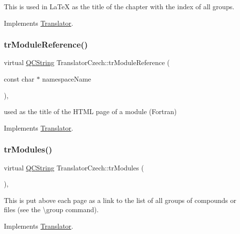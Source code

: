 This is used in La\+TeX as the title of the chapter with the index of all groups. 

Implements \mbox{\hyperlink{class_translator}{Translator}}.

\mbox{\label{class_translator_czech_a82a5db79fb72c7c2fd866e839df54123}} 
\subsubsection{\texorpdfstring{trModuleReference()}{trModuleReference()}}
{\footnotesize\ttfamily virtual \mbox{\hyperlink{class_q_c_string}{Q\+C\+String}} Translator\+Czech\+::tr\+Module\+Reference (\begin{DoxyParamCaption}\item[{const char $\ast$}]{namespace\+Name }\end{DoxyParamCaption})\hspace{0.3cm}{\ttfamily [inline]}, {\ttfamily [virtual]}}

used as the title of the H\+T\+ML page of a module (Fortran) 

Implements \mbox{\hyperlink{class_translator}{Translator}}.

\mbox{\label{class_translator_czech_aafd3c3fd4eea6b65d8b63368235e3eb9}} 
\subsubsection{\texorpdfstring{trModules()}{trModules()}}
{\footnotesize\ttfamily virtual \mbox{\hyperlink{class_q_c_string}{Q\+C\+String}} Translator\+Czech\+::tr\+Modules (\begin{DoxyParamCaption}{ }\end{DoxyParamCaption})\hspace{0.3cm}{\ttfamily [inline]}, {\ttfamily [virtual]}}

This is put above each page as a link to the list of all groups of compounds or files (see the \textbackslash{}group command). 

Implements \mbox{\hyperlink{class_translator}{Translator}}.

\mbox{\label{class_translator_czech_aece287473059fd31d4700daadc9d0b7b}} 
